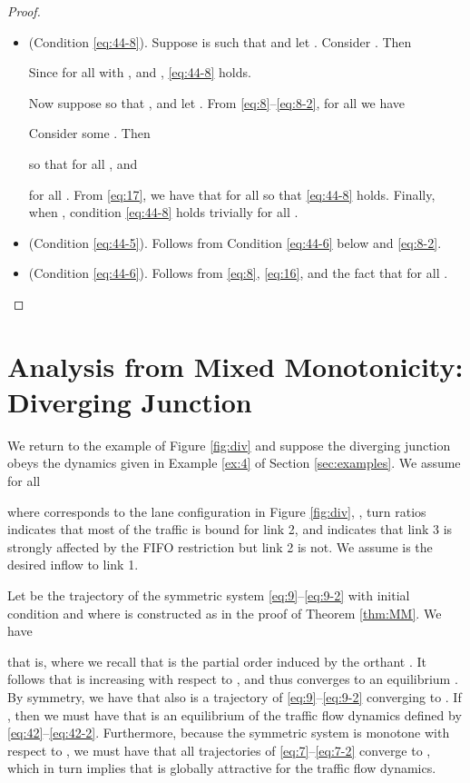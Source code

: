 \documentclass[letterpaper, 10 pt, conference]{ieeeconf}
\begin{document}
\begin{proof}
\begin{itemize}[leftmargin=*]
    \item    (Condition \ref{eq:44-8}). 
 Suppose  is such that  and let . Consider . Then

Since  for all  with , and , \ref{eq:44-8} holds.

 Now suppose  so that , and let . 
From \eqref{eq:8}--\eqref{eq:8-2}, for all  we have

Consider some . Then 

so that  for all , and

for all . From \eqref{eq:17}, we have that  for all  so that \ref{eq:44-8} holds. Finally, when , condition \ref{eq:44-8} holds trivially for all .
   
    \item    (Condition \ref{eq:44-5}). Follows from Condition \ref{eq:44-6} below and \eqref{eq:8-2}. 
    \item    (Condition \ref{eq:44-6}).  Follows from \eqref{eq:8}, \eqref{eq:16}, and the fact that  for all .
\end{itemize}
\end{proof}





\section{Analysis from Mixed Monotonicity: Diverging Junction}
\label{sec:example}














We return to the example of Figure \ref{fig:div} and suppose the diverging junction obeys the dynamics given in Example \ref{ex:4} of Section \ref{sec:examples}. We assume for all 

where  corresponds to the lane configuration in Figure \ref{fig:div}, , turn ratios  indicates that most of the traffic is bound for link 2, and  indicates that link 3 is strongly affected by the FIFO restriction but link 2 is not. We assume  is the desired inflow to link 1. 

Let  be the trajectory of the symmetric system \eqref{eq:9}--\eqref{eq:9-2} with initial condition  and  where  is constructed as in the proof of Theorem \ref{thm:MM}. We have

that is,  where we recall that  is the partial order induced by the orthant . It follows that  is increasing with respect to  \cite[Ch. 3, Prop. 2.1]{Smith:2008fk}, and thus converges to an equilibrium . By symmetry, we have that also  is a trajectory of \eqref{eq:9}--\eqref{eq:9-2} converging to . If , then we must have that  is an equilibrium of the traffic flow dynamics defined by \eqref{eq:42}--\eqref{eq:42-2}. Furthermore, because the symmetric system is monotone with respect to , we must have that all trajectories of \eqref{eq:7}--\eqref{eq:7-2} converge to , which in turn implies that  is globally attractive for the traffic flow dynamics.
\end{document}
